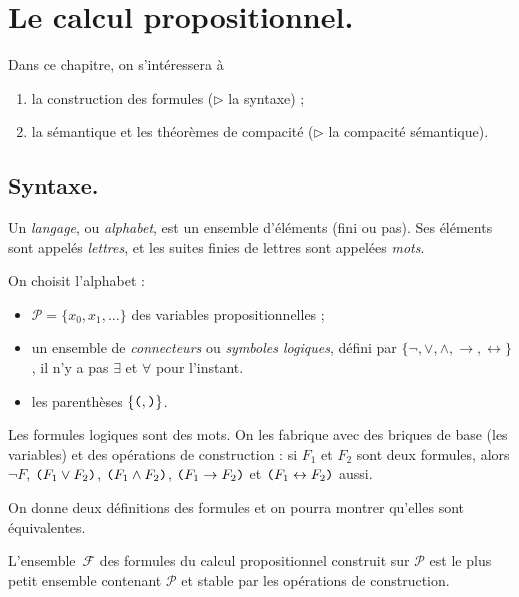 \documentclass[./main]{subfiles}
\begin{document}
  \chapter{Le calcul propositionnel.}

  Dans ce chapitre, on s'intéressera à
  \begin{enumerate}
    \item la construction des formules ($\triangleright$ la syntaxe) ;
    \item la sémantique et les théorèmes de compacité ($\triangleright$ la compacité sémantique).
  \end{enumerate}

  \section{Syntaxe.}

  \begin{defn}
    Un \textit{langage}, ou \textit{alphabet}, est un ensemble d'éléments (fini ou pas).
    Ses éléments sont appelés \textit{lettres}, et les suites finies de lettres sont appelées \textit{mots}.
  \end{defn}

  \begin{rmk}
    On choisit l'alphabet :
    \begin{itemize}
      \item $\mathcal{P} = \{x_0, x_1, \ldots\}$ des variables propositionnelles ;
      \item un ensemble de \textit{connecteurs} ou \textit{symboles logiques}, défini par $\{\lnot, \lor, \land, \to, \leftrightarrow\}$, il n'y a pas $\exists$ et $\forall$ pour l'instant.
      \item les parenthèses $\{\verb|(|, \verb|)|\}$.
    \end{itemize}


    Les formules logiques sont des mots. On les fabrique avec des briques de base (les variables) et des opérations de construction : si $F_1$ et $F_2$ sont deux formules, alors $\lnot F$,  $\verb|(| F_1 \lor F_2 \verb|)|$, $\verb|(| F_1 \land F_2 \verb|)|$, $\verb|(| F_1 \to F_2 \verb|)|$ et $\verb|(| F_1 \leftrightarrow F_2 \verb|)|$ aussi.
  \end{rmk}

  On donne deux définitions des formules et on pourra montrer qu'elles sont équivalentes.

  \begin{defn}
    L'ensemble~$\mathcal{F}$ des formules du calcul propositionnel construit sur $\mathcal{P}$ est le plus petit ensemble contenant $\mathcal{P}$ et stable par les opérations de construction.
  \end{defn}
\end{document}
